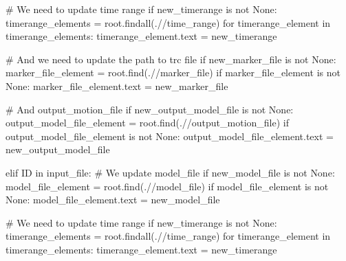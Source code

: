 \documentclass[
  letterpaper,
  DIV=11,
  numbers=noendperiod]{scrreprt}
\newenvironment{Shaded}{\begin{snugshade}}{\end{snugshade}}
\newcommand{\CommentTok}[1]{\textcolor[rgb]{0.37,0.37,0.37}{#1}}
\newcommand{\ControlFlowTok}[1]{\textcolor[rgb]{0.00,0.23,0.31}{#1}}
\newcommand{\KeywordTok}[1]{\textcolor[rgb]{0.00,0.23,0.31}{#1}}
\newcommand{\NormalTok}[1]{\textcolor[rgb]{0.00,0.23,0.31}{#1}}
\newcommand{\OperatorTok}[1]{\textcolor[rgb]{0.37,0.37,0.37}{#1}}
\newcommand{\StringTok}[1]{\textcolor[rgb]{0.13,0.47,0.30}{#1}}
\newcommand{\VariableTok}[1]{\textcolor[rgb]{0.07,0.07,0.07}{#1}}
\begin{document}
\begin{Shaded}
\begin{Highlighting}[]
        \CommentTok{\# We need to update time range}
        \ControlFlowTok{if}\NormalTok{ new\_timerange }\KeywordTok{is} \KeywordTok{not} \VariableTok{None}\NormalTok{:}
\NormalTok{            timerange\_elements }\OperatorTok{=}\NormalTok{ root.findall(}\StringTok{\textquotesingle{}.//time\_range\textquotesingle{}}\NormalTok{)}
            \ControlFlowTok{for}\NormalTok{ timerange\_element }\KeywordTok{in}\NormalTok{ timerange\_elements:}
\NormalTok{                timerange\_element.text }\OperatorTok{=}\NormalTok{ new\_timerange}

        \CommentTok{\# And we need to update the path to trc file}
        \ControlFlowTok{if}\NormalTok{ new\_marker\_file }\KeywordTok{is} \KeywordTok{not} \VariableTok{None}\NormalTok{:}
\NormalTok{            marker\_file\_element }\OperatorTok{=}\NormalTok{ root.find(}\StringTok{\textquotesingle{}.//marker\_file\textquotesingle{}}\NormalTok{)}
            \ControlFlowTok{if}\NormalTok{ marker\_file\_element }\KeywordTok{is} \KeywordTok{not} \VariableTok{None}\NormalTok{:}
\NormalTok{                marker\_file\_element.text }\OperatorTok{=}\NormalTok{ new\_marker\_file}

        \CommentTok{\# And output\_motion\_file}
        \ControlFlowTok{if}\NormalTok{ new\_output\_model\_file }\KeywordTok{is} \KeywordTok{not} \VariableTok{None}\NormalTok{:}
\NormalTok{            output\_model\_file\_element }\OperatorTok{=}\NormalTok{ root.find(}\StringTok{\textquotesingle{}.//output\_motion\_file\textquotesingle{}}\NormalTok{)}
            \ControlFlowTok{if}\NormalTok{ output\_model\_file\_element }\KeywordTok{is} \KeywordTok{not} \VariableTok{None}\NormalTok{:}
\NormalTok{                output\_model\_file\_element.text }\OperatorTok{=}\NormalTok{ new\_output\_model\_file}

    \ControlFlowTok{elif} \StringTok{\textquotesingle{}ID\textquotesingle{}} \KeywordTok{in}\NormalTok{ input\_file:}
        \CommentTok{\# We update model\_file}
        \ControlFlowTok{if}\NormalTok{ new\_model\_file }\KeywordTok{is} \KeywordTok{not} \VariableTok{None}\NormalTok{:}
\NormalTok{            model\_file\_element }\OperatorTok{=}\NormalTok{ root.find(}\StringTok{\textquotesingle{}.//model\_file\textquotesingle{}}\NormalTok{)}
            \ControlFlowTok{if}\NormalTok{ model\_file\_element }\KeywordTok{is} \KeywordTok{not} \VariableTok{None}\NormalTok{:}
\NormalTok{                model\_file\_element.text }\OperatorTok{=}\NormalTok{ new\_model\_file}

        \CommentTok{\# We need to update time range}
        \ControlFlowTok{if}\NormalTok{ new\_timerange }\KeywordTok{is} \KeywordTok{not} \VariableTok{None}\NormalTok{:}
\NormalTok{            timerange\_elements }\OperatorTok{=}\NormalTok{ root.findall(}\StringTok{\textquotesingle{}.//time\_range\textquotesingle{}}\NormalTok{)}
            \ControlFlowTok{for}\NormalTok{ timerange\_element }\KeywordTok{in}\NormalTok{ timerange\_elements:}
\NormalTok{                timerange\_element.text }\OperatorTok{=}\NormalTok{ new\_timerange}


\end{Highlighting}
\end{Shaded}
\end{document}
